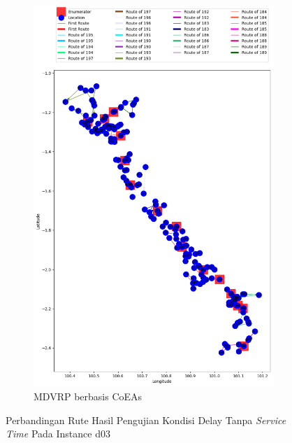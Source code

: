 \begin{figure}[H]
	\centering
	\begin{subfigure}[t]{\textwidth}
		\centering
		\includegraphics[width=\textwidth]{Resources/Images/delayed_3/real_m15_n100_delayed_3_coes}
		\caption{MDVRP berbasis CoEAs}
		\label{fig:real_m15_n100_delayed_3_coes}
	\end{subfigure}
	\caption{Perbandingan Rute Hasil Pengujian Kondisi Delay Tanpa \textit{Service Time} Pada Instance d03}
	\label{fig:real_m15_n100_delayed_3}
\end{figure}


